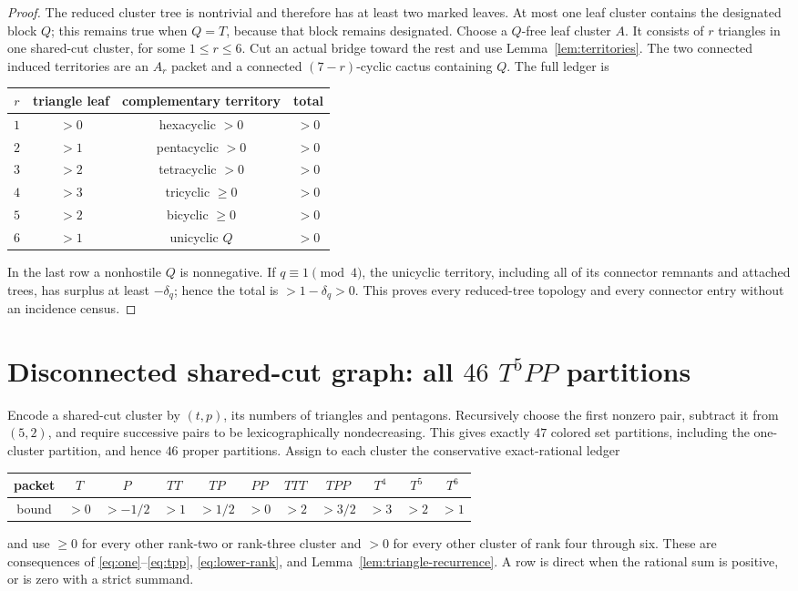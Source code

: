 \documentclass[11pt]{article}
\begin{document}
\begin{proof}
The reduced cluster tree is nontrivial and therefore has at least two marked
leaves.  At most one leaf cluster contains the designated block $Q$; this
remains true when $Q=T$, because that block remains designated.  Choose a
$Q$-free leaf cluster $A$.  It consists of $r$ triangles in one shared-cut
cluster, for some $1\leq r\leq6$.  Cut an actual bridge toward the rest and use
Lemma~\ref{lem:territories}.  The two connected induced territories are an
$A_r$ packet and a connected $(7-r)$-cyclic cactus containing $Q$.  The full
ledger is
\begin{center}
\begin{tabular}{c c c c}
$r$ & triangle leaf & complementary territory & total\\ \hline
$1$ & $>0$ & hexacyclic $>0$ & $>0$\\
$2$ & $>1$ & pentacyclic $>0$ & $>0$\\
$3$ & $>2$ & tetracyclic $>0$ & $>0$\\
$4$ & $>3$ & tricyclic $\geq0$ & $>0$\\
$5$ & $>2$ & bicyclic $\geq0$ & $>0$\\
$6$ & $>1$ & unicyclic $Q$ & $>0$
\end{tabular}
\end{center}
In the last row a nonhostile $Q$ is nonnegative.  If $q\equiv1\pmod4$, the
unicyclic territory, including all of its connector remnants and attached
trees, has surplus at least $-\delta_q$; hence the total is
$>1-\delta_q>0$.  This proves every reduced-tree topology and every connector
entry without an incidence census.
\end{proof}

\section{Disconnected shared-cut graph: all $46$ $T^5PP$ partitions}

Encode a shared-cut cluster by $(t,p)$, its numbers of triangles and pentagons.
Recursively choose the first nonzero pair, subtract it from $(5,2)$, and require
successive pairs to be lexicographically nondecreasing.  This gives exactly
$47$ colored set partitions, including the one-cluster partition, and hence
$46$ proper partitions.  Assign to each cluster the conservative exact-rational
ledger
\begin{center}
\begin{tabular}{c|cccccccccc}
packet&$T$&$P$&$TT$&$TP$&$PP$&$TTT$&$TPP$&$T^4$&$T^5$&$T^6$\\ \hline
bound&$>0$&$>-1/2$&$>1$&$>1/2$&$>0$&$>2$&$>3/2$&$>3$&$>2$&$>1$
\end{tabular}
\end{center}
and use $\geq0$ for every other rank-two or rank-three cluster and $>0$ for
every other cluster of rank four through six.  These are consequences of
\eqref{eq:one}--\eqref{eq:tpp}, \eqref{eq:lower-rank}, and
Lemma~\ref{lem:triangle-recurrence}.  A row is direct when the rational sum is
positive, or is zero with a strict summand.
\end{document}
